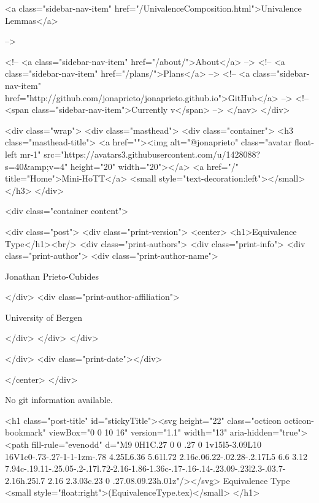       
    
      
        
          <a class="sidebar-nav-item" href="/UnivalenceComposition.html">Univalence Lemmas</a>
        
      
     -->

    <!-- <a class="sidebar-nav-item" href="/about/">About</a> -->
    <!-- <a class="sidebar-nav-item" href="/plans/">Plans</a> -->
    <!-- <a class="sidebar-nav-item" href="http://github.com/jonaprieto/jonaprieto.github.io">GitHub</a> -->
    <!-- <span class="sidebar-nav-item">Currently v</span> -->
  </nav>
</div>

    <div class="wrap">
      <div class="masthead">
        <div class="container">
          <h3 class="masthead-title">
            <a href=""><img alt="@jonaprieto" class="avatar float-left mr-1" src="https://avatars3.githubusercontent.com/u/1428088?s=40&amp;v=4" height="20" width="20"></a>
            <a href="/" title="Home">Mini-HoTT</a>
            <small style="text-decoration:left"></small>
          </h3>
        </div>
      
      <div class="container content">
        







<div class="post">
  <div class="print-version">
    <center>
      <h1>Equivalence Type</h1><br/>
        <div class="print-authors">
          <div class="print-info">
            <div class="print-author">
              <div class="print-author-name">
                
                  Jonathan Prieto-Cubides
                
              </div>
              <div class="print-author-affiliation">
                
                  University of Bergen
                
                </div>
            </div>
          </div>
          
          
        </div>
        <div class="print-date"></div>
        
        
    </center>
  </div>

  
  No git information available.
  

  <h1 class="post-title" id="stickyTitle"><svg height="22" class="octicon octicon-bookmark" viewBox="0 0 10 16" version="1.1" width="13" aria-hidden="true"><path fill-rule="evenodd" d="M9 0H1C.27 0 0 .27 0 1v15l5-3.09L10 16V1c0-.73-.27-1-1-1zm-.78 4.25L6.36 5.61l.72 2.16c.06.22-.02.28-.2.17L5 6.6 3.12 7.94c-.19.11-.25.05-.2-.17l.72-2.16-1.86-1.36c-.17-.16-.14-.23.09-.23l2.3-.03.7-2.16h.25l.7 2.16 2.3.03c.23 0 .27.08.09.23h.01z"/></svg> Equivalence Type <small style="float:right">(EquivalenceType.tex)</small>
  </h1>

